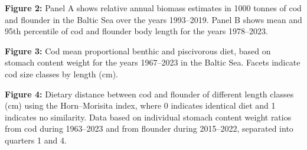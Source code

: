 \documentclass[12pt]{article}
\begin{document}
{\bf Figure 2:} Panel A shows relative annual biomass estimates in 1000 tonnes of cod and flounder in the Baltic Sea over the years 1993--2019. Panel B shows mean and 95th percentile of cod and flounder body length for the years 1978--2023.

{\bf Figure 3:} Cod mean proportional benthic and piscivorous diet, based on stomach content weight for the years 1967--2023 in the Baltic Sea. Facets indicate cod size classes by length (cm).

{\bf Figure 4:} Dietary distance between cod and flounder of different length classes (cm) using the Horn--Morisita index, where 0 indicates identical diet and 1 indicates no similarity. Data based on individual stomach content weight ratios from cod during 1963--2023 and from flounder during 2015--2022, separated into quarters 1 and 4.
\end{document}
